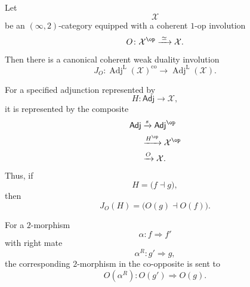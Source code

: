 \begin{proposition}
\label{prop:specified-mate-reversal-involution}
Let
\[
    \mathcal X
\]
be an $(\infty,2)$-category equipped with a coherent $1$-op involution
\[
    O
    \colon
    \mathcal X^{\op}
    \xrightarrow{\;\simeq\;}
    \mathcal X.
\]
Then there is a canonical coherent weak duality involution
\[
    J_O
    \colon
    \operatorname{Adj}^{\mathrm L}(\mathcal X)^{\mathrm{co}}
    \longrightarrow
    \operatorname{Adj}^{\mathrm L}(\mathcal X).
\]

For a specified adjunction represented by
\[
    H
    \colon
    \mathsf{Adj}
    \longrightarrow
    \mathcal X,
\]
it is represented by the composite
\[
\begin{aligned}
    \mathsf{Adj}
    &\xrightarrow{s}
    \mathsf{Adj}^{\op}
    \\
    &\xrightarrow{H^{\op}}
    \mathcal X^{\op}
    \\
    &\xrightarrow{O}
    \mathcal X.
\end{aligned}
\]
Thus, if
\[
    H
    =
    \bigl(
        f\dashv g
    \bigr),
\]
then
\[
    J_O(H)
    =
    \bigl(
        O(g)\dashv O(f)
    \bigr).
\]

For a $2$-morphism
\[
    \alpha
    \colon
    f
    \Longrightarrow
    f'
\]
with right mate
\[
    \alpha^R
    \colon
    g'
    \Longrightarrow
    g,
\]
the corresponding $2$-morphism in the co-opposite is sent to
\[
    O(\alpha^R)
    \colon
    O(g')
    \Longrightarrow
    O(g).
\]
\end{proposition}

